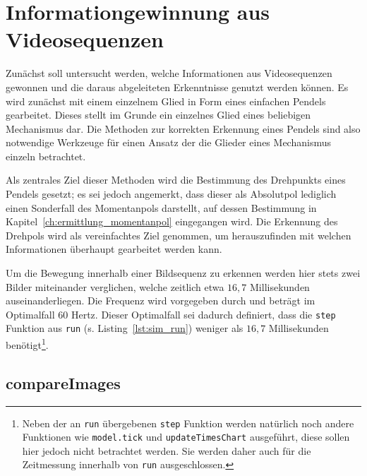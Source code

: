 
\chapter{Informationgewinnung aus Videosequenzen}\label{ch:infoerhalt_aus_abgleich_bilder}


Zunächst soll untersucht werden, welche Informationen aus Videosequenzen gewonnen und die daraus abgeleiteten Erkenntnisse genutzt werden können.
Es wird zunächst mit einem einzelnem Glied in Form eines einfachen Pendels gearbeitet.
Dieses stellt im Grunde ein einzelnes Glied eines beliebigen Mechanismus dar.
Die Methoden zur korrekten Erkennung eines Pendels sind also notwendige Werkzeuge für einen Ansatz der die Glieder eines Mechanismus einzeln betrachtet.

Als zentrales Ziel dieser Methoden wird die Bestimmung des Drehpunkts eines Pendels gesetzt; es sei jedoch angemerkt, dass dieser als Absolutpol lediglich einen Sonderfall des Momentanpols darstellt, auf dessen Bestimmung in Kapitel~\ref{ch:ermittlung_momentanpol} eingegangen wird.
Die Erkennung des Drehpols wird als vereinfachtes Ziel genommen, um herauszufinden mit welchen Informationen überhaupt gearbeitet werden kann.

Um die Bewegung innerhalb einer Bildsequenz zu erkennen werden hier stets zwei Bilder miteinander verglichen, welche zeitlich etwa $16,7$ Millisekunden auseinanderliegen.
Die Frequenz wird vorgegeben durch  und beträgt im Optimalfall 60 Hertz.
Dieser Optimalfall sei dadurch definiert, dass die \lstinline{step} Funktion aus \lstinline{run} (s. Listing~\ref{lst:sim_run}) weniger als $16,7$ Millisekunden benötigt\footnote{Neben der an \lstinline{run} übergebenen \lstinline{step} Funktion werden natürlich noch andere Funktionen wie \lstinline{model.tick} und \lstinline{updateTimesChart} ausgeführt, diese sollen hier jedoch nicht betrachtet werden. Sie werden daher auch für die Zeitmessung innerhalb von \lstinline{run} ausgeschlossen.}.

\section{compareImages}

